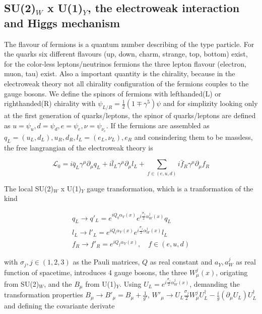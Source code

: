 \subsection*{\small SU(2)$_{W}$ x U(1)$_{Y}$, the electroweak interaction and Higgs mechanism}

The flavour of fermions is a quantum number describing of the type particle. For the quarks six different flavours (up, down, charm, strange, top, bottom) exist, for the color-less leptons/neutrinos fermions the three lepton flavour (electron, muon, tau) exist. Also a important quantity is the chirality, because in the electroweak theory not all chirality configuration of the fermions couples to the gauge bosons. We define the spinors of fermions with lefthanded(L) or righthanded(R) chirality with $\psi_{L/R} = \frac{1}{2}(1\mp \gamma^{5})\psi$ and for simplizity looking only at the first generation of quarks/leptons, the spinor of quarks/leptons are defined as $u = \psi_{u}, d = \psi_{d}, e = \psi_{e}, \nu = \psi_{\nu_{e}}$. If the fermions are assembled as $q_{L} = (u_{L}, d_{L}), u_{R}, d_{R}, l_{L} = (e_{L}, \nu_{L}), e_{R}$ and consindering them to be massless, the free langrangian of the electroweak theory is


\begin{equation}
	\mathcal{L}_{0} = i\bar{q}_{L}\gamma^{\mu}\partial_{\mu}q_{L} + i\bar{l}_{L}\gamma^{\mu}\partial_{\mu}l_{L} + \sum_{f \in (e, u, d)} i\bar{f}_{R}\gamma^{\mu}\partial_{\mu}f_{R}
\end{equation}

The local SU(2)$_{W}$ x U(1)$_{Y}$ gauge transformation, which is a tranformation of the kind


\begin{equation}
	\begin{split}
		q_{L} \rightarrow q'_{L} = e^{iQ_{q} \alpha_{Y}(x)} e^{i\frac{\sigma_{j}}{2}\alpha^{j}_{W}(x)}q_{L} \\
		l_{L} \rightarrow l'_{L} = e^{iQ_{l} \alpha_{Y}(x)} e^{i\frac{\sigma_{j}}{2}\alpha^{j}_{W}(x)}l_{L} \\
		f_{R} \rightarrow f'_{R} = e^{iQ_{f} \alpha_{Y}(x)}, \quad f \in (e, u, d)
	\end{split}			
\end{equation}


with $\sigma_{j}, j \in (1,2,3)$ as the Pauli matrices, $Q$ as real constant and $a_{Y}, a^{j}_{W}$ as real function of spacetime, introduces 4 gauge bosons, the three $W^{j}_{\mu}(x)$, origating from SU(2)$_{W}$, and the $B_{\mu}$ from U(1)$_{Y}$. Using $U_{L} = e^{i\frac{\sigma_{j}}{2}\alpha^{j}_{W}(x)}$, demanding the transformation properties $B_{\mu} \rightarrow B'_{\mu} = B_{\mu} + \frac{1}{g'}$, $W'_{\mu} \rightarrow U_{L}\frac{\sigma_{j}}{2}W_{\mu}^{j}U_{L}^{\dagger} - \frac{i}{g}(\partial_{\mu}U_{L})U_{L}^{\dagger}$ and defining the covariante derivate 

